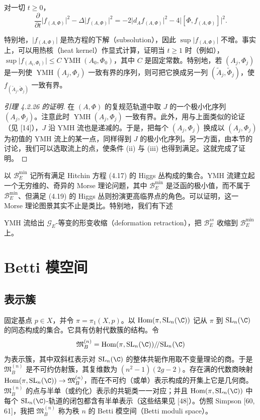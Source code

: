\begin{lemma}
对一切 $t\ge0$，
\[
\frac{\partial}{\partial t}\bigl|f_{(A,\Phi)}\bigr|^2-\Delta\bigl|f_{(A,\Phi)}\bigr|^2
=-2\bigl|d_Af_{(A,\Phi)}\bigr|^2-4\bigl|[\Phi,f_{(A,\Phi)}]\bigr|^2.
\]
\end{lemma}

特别地，$\bigl|f_{(A,\Phi)}\bigr|$ 是热方程的下解（subsolution），因此 $\sup\bigl|f_{(A,\Phi)}\bigr|$ 不增。事实上，可以用热核（heat kernel）作显式计算，证明当 $t\ge1$ 时（例如），$\sup\bigl|f_{(A_t,\Phi_t)}\bigr|\le C\operatorname{YMH}(A_0,\Phi_0)$，其中 $C$ 是固定常数。特别地，若 $(A_j,\Phi_j)$ 是一列使 $\operatorname{YMH}(A_j,\Phi_j)$ 一致有界的序列，则可把它换成另一列 $(\tilde A_j,\tilde\Phi_j)$，使 $f_{(\tilde A_j,\tilde\Phi_j)}$ 一致有界。

\begin{proof}[引理 4.2.26 的证明]
在 $(A,\Phi)$ 的复规范轨道中取 $J$ 的一个极小化序列 $(A_j,\Phi_j)$。注意此时 $\operatorname{YMH}(A_j,\Phi_j)$ 一致有界。此外，用与上面类似的论证（见 [14]），$J$ 沿 YMH 流也是递减的。于是，把每个 $(A_j,\Phi_j)$ 换成以 $(A_j,\Phi_j)$ 为初值的 YMH 流上的某一点，同样得到 $J$ 的极小化序列。另一方面，由本节的讨论，我们可以选取流上的点，使条件 (ii) 与 (iii) 也得到满足。这就完成了证明。
\end{proof}

以 $\mathcal{B}^{\min}_E$ 记所有满足 Hitchin 方程 (4.17) 的 Higgs 丛构成的集合。YMH 流建立起一个无穷维的、奇异的 Morse 理论问题，其中 $\mathcal{B}^{\min}_E$ 是泛函的极小值，而不属于 $\mathcal{B}^{\min}_E$、但满足 (4.19) 的 Higgs 丛则扮演更高临界点的角色。可以证明，这一 Morse 理论图景其实不止是类比。特别地，我们有下述

\begin{theorem}[{Wilkin, [69]}]
YMH 流给出 $\mathcal{G}_E$-等变的形变收缩（deformation retraction），把 $\mathcal{B}^{ss}_E$ 收缩到 $\mathcal{B}^{\min}_E$ 上。
\end{theorem}

\section{Betti 模空间}

\subsection{表示簇}

固定基点 $p\in X$，并令 $\pi=\pi_1(X,p)$。以 $\operatorname{Hom}(\pi,\mathrm{SL}_n(\C))$ 记从 $\pi$ 到 $\mathrm{SL}_n(\C)$ 的同态构成的集合。它具有仿射代数簇的结构。令
\[
\mathfrak{M}^{(n)}_B=\operatorname{Hom}(\pi,\mathrm{SL}_n(\C))/\!/\mathrm{SL}_n(\C)
\]
为表示簇，其中双斜杠表示对 $\mathrm{SL}_n(\C)$ 的整体共轭作用取不变量理论的商。于是 $\mathfrak{M}^{(n)}_B$ 是不可约仿射簇，其复维数为 $(n^2-1)(2g-2)$。存在满的代数商映射 $\operatorname{Hom}(\pi,\mathrm{SL}_n(\C))\to\mathfrak{M}^{(n)}_B$，而在不可约（或单）表示构成的开集上它是几何商。$\mathfrak{M}^{(n)}_B$ 的点与半单（或约化）表示的共轭类一一对应；并且 $\operatorname{Hom}(\pi,\mathrm{SL}_n(\C))$ 中每个 $\mathrm{SL}_n(\C)$-轨道的闭包都含有半单表示（这些结果见 [48]）。仿照 Simpson [60, 61]，我把 $\mathfrak{M}^{(n)}_B$ 称为秩 $n$ 的 Betti 模空间（Betti moduli space）。

